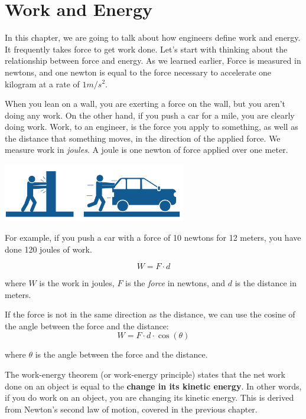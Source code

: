 \chapter{Work and Energy}

In this chapter, we are going to talk about how engineers define work
and energy. It frequently takes force to get work done. Let's start with thinking 
about the relationship between force and energy. As we learned earlier, Force is 
measured in newtons, and one newton is equal to the force necessary to accelerate 
one kilogram at a rate of $1 m/s^2$.

When you lean on a wall, you are exerting a force on the wall, but you
aren't doing any work. On the other hand, if you push a car for a mile,
you are clearly doing work. Work, to an engineer, is the force you
apply to something, as well as the distance that something moves, in the direction
of the applied force. We measure work in \textit{joules}. A joule is one
newton of force applied over one meter.

\begin{center}
\includegraphics[width=0.6\textwidth]{workvsforce.png}
\end{center}

For example, if you push a car with a force of 10 newtons for 12
meters, you have done 120 joules of work.

\begin{mdframed}[style=important, frametitle={Formula for Work}]
\[
W = F \cdot d
\]

where $W$ is the work in joules, $F$ is the \textit{force} in newtons, and $d$ is 
the distance in meters.

If the force is not in the same direction as the distance, we can use the cosine 
of the angle between the force and the distance:
\[
W = F \cdot d \cdot \cos(\theta)
\]

where $\theta$ is the angle between the force and the distance.
\end{mdframed}

The work-energy theorem (or work-energy principle) states that the net work done 
on an object is equal to the \textbf{change in its kinetic energy}. In other 
words, if you do work on an object, you are changing its kinetic energy. This is 
derived from Newton's second law of motion, covered in the previous chapter. 

